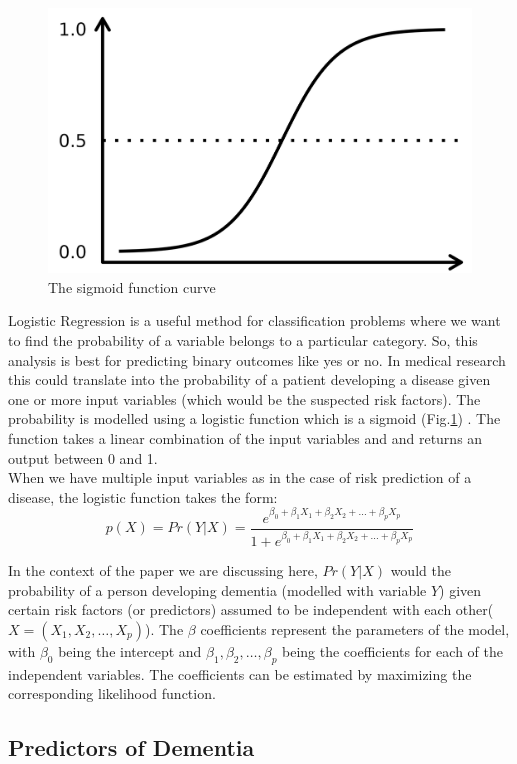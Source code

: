 \documentclass[12pt,letterpaper]{article}
\begin{document}
\begin{figure}
\vspace{-7 mm}
\includegraphics[width=7 cm]{sigmoid.png}
\caption{The sigmoid function curve}
\label{dvdr}
\end{figure}
Logistic Regression is a useful method for classification problems where we want to find the probability of a variable belongs to a particular category. So, this analysis is best for predicting binary outcomes like yes or no. In medical research this could translate into the probability of a patient developing a disease given one or more input variables (which would be the suspected risk factors). The probability is modelled using a logistic function which is a sigmoid (Fig.\ref{dvdr}) . The function takes a linear combination of the input variables and  and returns an output between 0 and 1. \\

When we have multiple input variables as in the case of risk prediction of a disease, the logistic function takes the form:
\begin{equation}
p(X) =Pr (Y|X)= \frac{e^{\beta_0+\beta_1X_1+\beta_2X_2+...+\beta_pX_p}}{1+e^{\beta_0+\beta_1X_1+\beta_2X_2+...+\beta_pX_p}}
\end{equation}

In the context of the paper we are discussing here, $Pr (Y|X)$ would the probability of a person developing dementia (modelled with variable $Y$) given certain risk factors (or predictors) assumed to be independent with each other($X=(X_1,X_2,\dots,X_p)$). The $\beta$ coefficients represent the parameters of the model, with $\beta_0$ being the intercept and $\beta_1,\beta_2,\dots,\beta_p$ being the coefficients for each of the independent variables. The coefficients can be estimated by maximizing the corresponding likelihood function.  

\subsection{Predictors of Dementia}
\end{document}
